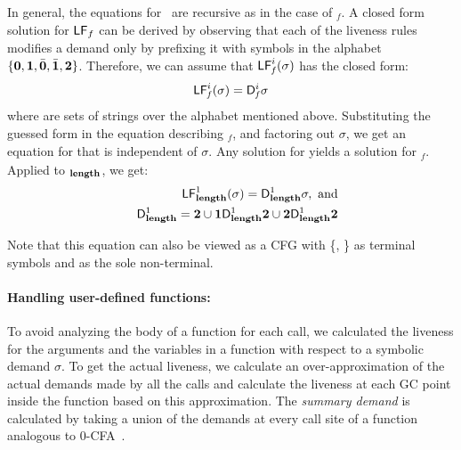 \documentclass[9pt,nonatbib]{sigplanconf}
\begin{document}
In general, the equations for \Lfonly\ are recursive as in the case of
\Lfonly$_\mathit{f}$. A closed  form solution for $\mathsf{LF}_{\mathit \mathit{f}}$
can be derived by observing that each of the liveness rules modifies a
demand  only by  prefixing it  with symbols  in the  alphabet $\lbrace
\mathbf{0}, \mathbf{1},\bar{\mathbf{0}},  \bar{\mathbf{1}}, {\mathbf{2}}  \rbrace$. Therefore, we  can assume
that $\mathsf{LF}_{\mathit f}^{i}( {\mathit \sigma})$ has the closed form:
\begin{eqnarray}
\label{eq:LF:DI}
  \mathsf{LF}_{\mathit f}^{i}( {\mathit \sigma}) = \mathsf{D}_{\mathit f}^{i}\sigma
\end{eqnarray}
where   are sets of strings  over the alphabet
mentioned above.  Substituting the  guessed form in the
equation   describing    \Lfonly$_{\mathit   f}$,   and
factoring  out   $\sigma$,  we  get  an   equation  for
  that   is  independent  of   $\sigma$.   Any
solution   for      yields  a   solution   for
\Lfonly$_{\mathit  f}$.   Applied to  \Lfonly$_{\mathit
  {\mathbf{length}}}$, we get:
  \begin{eqnarray*}
&&  \mathsf{LF}_{\mathit {\mathbf{length}} }^{1}( {\mathit \sigma}) = \mathsf{D}_{\mathit {\mathbf{length}}}^{1}\sigma,~\mbox{and}\\
&&   \mathsf{D}_{\mathit {\mathbf{length}}}^{1} = {\mathbf{2}} \cup \mathbf{1}\mathsf{D}_{\mathit {\mathbf{length}}}^{1}{\mathbf{2}}
       \cup {\mathbf{2}}\mathsf{D}_{\mathit {\mathbf{length}}}^{1}{{\mathbf{2}}}
  \end{eqnarray*}

Note that this equation can also be viewed as a CFG with \{\acdr,
\clazy\} as terminal symbols and  as the sole
non-terminal.
\paragraph{Handling user-defined functions:}
\label{sec:bodylivenessbodies}
To  avoid analyzing  the body  of a  function for  each
call, we calculated the  liveness for the arguments and
the variables in a function  with respect to a symbolic
demand  $\sigma$.   To  get   the  actual  liveness,  we
calculate an  over-approximation of the  actual demands
made by  all the  calls and  calculate the  liveness at
each  GC  point  inside  the  function  based  on  this
approximation.  The {\em summary demand} is
calculated by  taking a union  of the demands  at every
call site of a function analogous to 0-CFA~\cite{Shivers:1988}.
\end{document}
